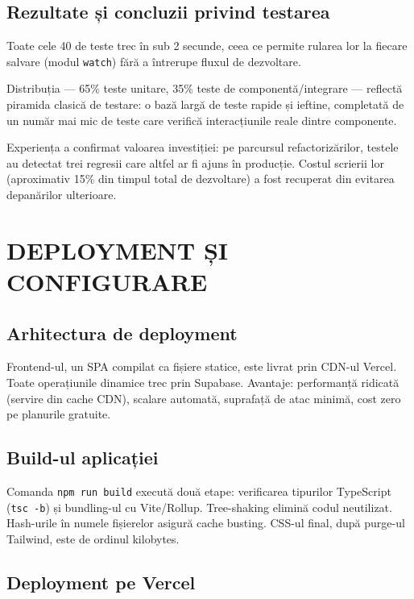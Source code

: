 \documentclass[12pt,a4paper,oneside]{report}
\begin{document}
\section{Rezultate și concluzii privind testarea}

Toate cele 40 de teste trec în sub 2 secunde, ceea ce permite rularea lor la fiecare salvare (modul \texttt{watch}) fără a întrerupe fluxul de dezvoltare.

Distribuția — 65\% teste unitare, 35\% teste de componentă/integrare — reflectă piramida clasică de testare: o bază largă de teste rapide și ieftine, completată de un număr mai mic de teste care verifică interacțiunile reale dintre componente.

Experiența a confirmat valoarea investiției: pe parcursul refactorizărilor, testele au detectat trei regresii care altfel ar fi ajuns în producție. Costul scrierii lor (aproximativ 15\% din timpul total de dezvoltare) a fost recuperat din evitarea depanărilor ulterioare.


\chapter{DEPLOYMENT ȘI CONFIGURARE}

\section{Arhitectura de deployment}

Frontend-ul, un SPA compilat ca fișiere statice, este livrat prin CDN-ul Vercel. Toate operațiunile dinamice trec prin Supabase. Avantaje: performanță ridicată (servire din cache CDN), scalare automată, suprafață de atac minimă, cost zero pe planurile gratuite.

\section{Build-ul aplicației}

Comanda \texttt{npm run build} execută două etape: verificarea tipurilor TypeScript (\texttt{tsc -b}) și bundling-ul cu Vite/Rollup. Tree-shaking elimină codul neutilizat. Hash-urile în numele fișierelor asigură cache busting. CSS-ul final, după purge-ul Tailwind, este de ordinul kilobytes.

\section{Deployment pe Vercel}
\end{document}
